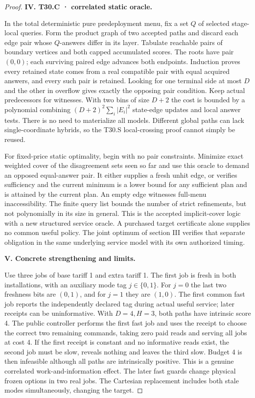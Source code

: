 \begin{proof}
\textbf{IV. T30.C · correlated static oracle.}

In the total deterministic pure predeployment menu, fix a set \(Q\) of selected stage-local queries. Form the product graph of two accepted paths and discard each edge pair whose \(Q\)-answers differ in its layer. Tabulate reachable pairs of boundary vertices and both capped accumulated scores. The roots have pair \((0,0)\); each surviving paired edge advances both endpoints. Induction proves every retained state comes from a real compatible pair with equal acquired answers, and every such pair is retained. Looking for one terminal side at most \(D\) and the other in overflow gives exactly the opposing pair condition. Keep actual predecessors for witnesses. With two bins of size \(D+2\) the cost is bounded by a polynomial combining \((D+2)^2\sum_i |E_i|^2\) state-edge updates and local answer tests. There is no need to materialize all models. Different global paths can lack single-coordinate hybrids, so the T30.S local-crossing proof cannot simply be reused.

For fixed-price static optimality, begin with no pair constraints. Minimize exact weighted cover of the disagreement sets seen so far and use this oracle to demand an opposed equal-answer pair. It either supplies a fresh unhit edge, or verifies sufficiency and the current minimum is a lower bound for any sufficient plan and is attained by the current plan. An empty edge witnesses full-menu inaccessibility. The finite query list bounds the number of strict refinements, but not polynomially in its size in general. This is the accepted implicit-cover logic with a new structured service oracle. A purchased target certificate alone supplies no common useful policy. The joint optimum of section III verifies that separate obligation in the same underlying service model with its own authorized timing.

\textbf{V. Concrete strengthening and limits.}

Use three jobs of base tariff 1 and extra tariff 1. The first job is fresh in both installations, with an auxiliary mode tag \(j\in\{0,1\}\). For \(j=0\) the last two freshness bits are \((0,1)\), and for \(j=1\) they are \((1,0)\). The first common fast job reports the independently declared tag during actual useful service; later receipts can be uninformative. With \(D=4,H=3\), both paths have intrinsic score 4. The public controller performs the first fast job and uses the receipt to choose the correct two remaining commands, taking zero paid reads and serving all jobs at cost 4. If the first receipt is constant and no informative reads exist, the second job must be slow, reveals nothing and leaves the third slow. Budget 4 is then infeasible although all paths are intrinsically positive. This is a genuine correlated work-and-information effect. The later fast guards change physical frozen options in two real jobs. The Cartesian replacement includes both stale modes simultaneously, changing the target.


\end{proof}
